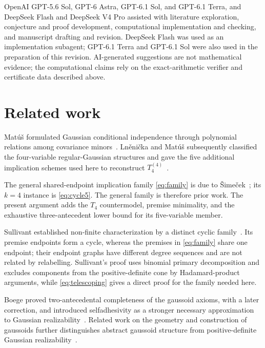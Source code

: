 \documentclass[10pt]{article}
\theoremstyle{definition}
\newcommand{\Tfour}{T_4}
\begin{document}
OpenAI GPT-5.6 Sol, GPT-6 Astra, GPT-6.1 Sol, and GPT-6.1 Terra, and DeepSeek Flash and DeepSeek V4 Pro assisted with literature exploration, conjecture and proof development, computational implementation and checking, and manuscript drafting and revision.  DeepSeek Flash was used as an implementation subagent; GPT-6.1 Terra and GPT-6.1 Sol were also used in the preparation of this revision.  AI-generated suggestions are not mathematical evidence; the computational claims rely on the exact-arithmetic verifier and certificate data described above.

\section{Related work}\label{sec:prior}

Mat\'u\v{s} formulated Gaussian conditional independence through polynomial relations among covariance minors~\cite{Matus2005}.  Ln\v{e}ni\v{c}ka and Mat\'u\v{s} subsequently classified the four-variable regular-Gaussian structures and gave the five additional implication schemes used here to reconstruct $\Tfour^{(4)}$~\cite{LM2007}.

The general shared-endpoint implication family \eqref{eq:family} is due to \v{S}ime\v{c}ek~\cite{Simecek2006}; its $k=4$ instance is \eqref{eq:cycle5}.  The general family is therefore prior work.  The present argument adds the $\Tfour$ countermodel, premise minimality, and the exhaustive three-antecedent lower bound for its five-variable member.

Sullivant established non-finite characterization by a distinct cyclic family~\cite{Sullivant2009}.  Its premise endpoints form a cycle, whereas the premises in \eqref{eq:family} share one endpoint; their endpoint graphs have different degree sequences and are not related by relabelling.  Sullivant's proof uses binomial primary decomposition and excludes components from the positive-definite cone by Hadamard-product arguments, while \eqref{eq:telescoping} gives a direct proof for the family needed here.

Boege proved two-antecedental completeness of the gaussoid axioms, with a later correction, and introduced selfadhesivity as a stronger necessary approximation to Gaussian realizability~\cite{Boege2022,BoegeCorrection2022,BoegeSA2023}.  Related work on the geometry and construction of gaussoids further distinguishes abstract gaussoid structure from positive-definite Gaussian realizability~\cite{Geometry2019,Construction2020}.
\end{document}
